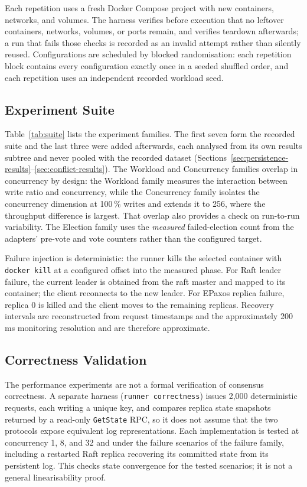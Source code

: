 Each repetition uses a fresh Docker Compose project with new containers,
networks, and volumes. The harness verifies before execution that no
leftover containers, networks, volumes, or ports remain, and verifies
teardown afterwards; a run that fails those checks is recorded as an invalid
attempt rather than silently reused. Configurations are scheduled by blocked
randomisation: each repetition block contains every configuration exactly
once in a seeded shuffled order, and each repetition uses an independent
recorded workload seed.

\subsection{Experiment Suite}

Table~\ref{tab:suite} lists the experiment families. The first seven form
the recorded suite and the last three were added afterwards, each analysed
from its own results subtree and never pooled with the recorded dataset
(Sections~\ref{sec:persistence-results}--\ref{sec:conflict-results}). The
Workload and Concurrency families overlap in concurrency by design: the
Workload family measures the interaction between write ratio and
concurrency, while the Concurrency family isolates the concurrency dimension
at 100\,\% writes and extends it to 256, where the throughput difference is
largest. That overlap also provides a check on run-to-run variability. The
Election family uses the \emph{measured} failed-election count from the
adapters' pre-vote and vote counters rather than the configured target.



Failure injection is deterministic: the runner kills the selected container
with \texttt{docker kill} at a configured offset into the measured phase.
For Raft leader failure, the current leader is obtained from the raft master
and mapped to its container; the client reconnects to the new leader. For
EPaxos replica failure, replica 0 is killed and the client moves to the
remaining replicas. Recovery intervals are reconstructed from request
timestamps and the approximately 200\,ms monitoring resolution and are
therefore approximate.

\subsection{Correctness Validation}

The performance experiments are not a formal verification of consensus
correctness. A separate harness (\texttt{runner correctness}) issues
2{,}000 deterministic requests, each writing a unique key, and compares
replica state snapshots returned by a read-only \texttt{GetState} RPC, so it
does not assume that the two protocols expose equivalent log
representations. Each implementation is tested at concurrency 1, 8, and 32
and under the failure scenarios of the failure family, including a restarted
Raft replica recovering its committed state from its persistent log. This
checks state convergence for the tested scenarios; it is not a general
linearisability proof.

